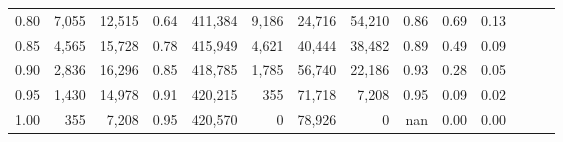 \begin{tabular}{rrrrrrrrrrrrrr}
0.80 &   7,055 &  12,515 &  0.64 &  411,384 &    9,186 &  24,716 &  54,210 &  0.86 &  0.69 &      0.13 \\
0.85 &   4,565 &  15,728 &  0.78 &  415,949 &    4,621 &  40,444 &  38,482 &  0.89 &  0.49 &      0.09 \\
0.90 &   2,836 &  16,296 &  0.85 &  418,785 &    1,785 &  56,740 &  22,186 &  0.93 &  0.28 &      0.05 \\
0.95 &   1,430 &  14,978 &  0.91 &  420,215 &      355 &  71,718 &   7,208 &  0.95 &  0.09 &      0.02 \\
1.00 &     355 &   7,208 &  0.95 &  420,570 &        0 &  78,926 &       0 &   nan &  0.00 &      0.00 \\
\bottomrule
\end{tabular}
